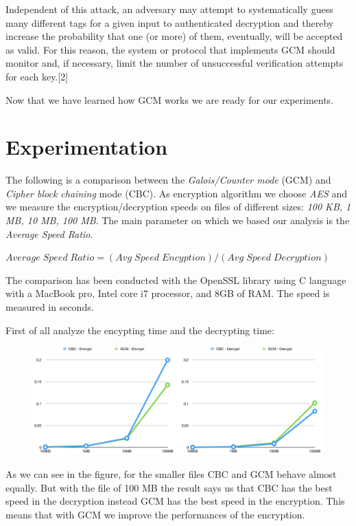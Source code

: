 \documentclass[11pt]{article}
\begin{document}
Independent of this attack, an adversary may attempt to systematically guess many different tags for a given input to authenticated decryption and thereby increase the probability that one (or more) of them, eventually, will be accepted as valid. For this reason, the system or protocol that implements GCM should monitor and, if necessary, limit the number of unsuccessful verification attempts for each key.[2]

Now that we have learned how GCM works we are ready for our experiments.

\section{Experimentation}
The following is a comparison between the {\em Galois/Counter mode} (GCM) and {\em Cipher block chaining} mode (CBC). As encryption algorithm we choose {\em AES} and we measure the encryption/decryption speeds on files of different sizes: {\em 100 KB, 1 MB, 10 MB, 100 MB}. The main parameter on which we based our analysis is the {\em Average Speed Ratio}.

\bigskip
$ Average\;Speed\;Ratio = (Avg\;Speed\;Encyption)/(Avg\;Speed\;Decryption) $
\bigskip

The comparison has been conducted with the OpenSSL library using C language with a MacBook pro, Intel core i7 processor, and 8GB of RAM. The speed is measured in seconds.

First of all analyze the encypting time and the decrypting time:

\begin{figure}[hbt!]
  \centering
  \includegraphics[width=1\textwidth]{pic6-hw3-1635747}
  \label{fig:enc-dec speed}
\end{figure}

As we can see in the figure, for the smaller files CBC and GCM behave almost equally. But with the file of 100 MB the result says us that CBC has the best speed in the decryption instead GCM has the best speed in the encryption. This means that with GCM we improve the performances of the encryption.
\end{document}
